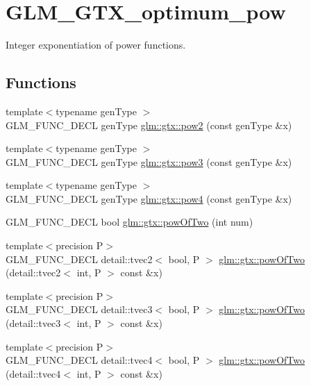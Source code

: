 \hypertarget{group__gtx__optimum__pow}{}\section{G\+L\+M\+\_\+\+G\+T\+X\+\_\+optimum\+\_\+pow}
\label{group__gtx__optimum__pow}


Integer exponentiation of power functions.  


\subsection*{Functions}
\begin{DoxyCompactItemize}
\item 
{\footnotesize template$<$typename gen\+Type $>$ }\\G\+L\+M\+\_\+\+F\+U\+N\+C\+\_\+\+D\+E\+CL gen\+Type \hyperlink{group__gtx__optimum__pow_gad18baedb0f3eaea4b4544771e19574f5}{glm\+::gtx\+::pow2} (const gen\+Type \&x)
\item 
{\footnotesize template$<$typename gen\+Type $>$ }\\G\+L\+M\+\_\+\+F\+U\+N\+C\+\_\+\+D\+E\+CL gen\+Type \hyperlink{group__gtx__optimum__pow_ga47dbbd973d7ad8be1b135d57281e16cf}{glm\+::gtx\+::pow3} (const gen\+Type \&x)
\item 
{\footnotesize template$<$typename gen\+Type $>$ }\\G\+L\+M\+\_\+\+F\+U\+N\+C\+\_\+\+D\+E\+CL gen\+Type \hyperlink{group__gtx__optimum__pow_gabae007bac8e442a2601db03de5827107}{glm\+::gtx\+::pow4} (const gen\+Type \&x)
\item 
G\+L\+M\+\_\+\+F\+U\+N\+C\+\_\+\+D\+E\+CL bool \hyperlink{group__gtx__optimum__pow_ga399b24df28267c1f061c462dd359affd}{glm\+::gtx\+::pow\+Of\+Two} (int num)
\item 
{\footnotesize template$<$precision P$>$ }\\G\+L\+M\+\_\+\+F\+U\+N\+C\+\_\+\+D\+E\+CL detail\+::tvec2$<$ bool, P $>$ \hyperlink{group__gtx__optimum__pow_ga2dff80972edb8f4be69e40bb27ed0a9b}{glm\+::gtx\+::pow\+Of\+Two} (detail\+::tvec2$<$ int, P $>$ const \&x)
\item 
{\footnotesize template$<$precision P$>$ }\\G\+L\+M\+\_\+\+F\+U\+N\+C\+\_\+\+D\+E\+CL detail\+::tvec3$<$ bool, P $>$ \hyperlink{group__gtx__optimum__pow_ga103cbf6e3d63ab4c2bb5449e19b8639d}{glm\+::gtx\+::pow\+Of\+Two} (detail\+::tvec3$<$ int, P $>$ const \&x)
\item 
{\footnotesize template$<$precision P$>$ }\\G\+L\+M\+\_\+\+F\+U\+N\+C\+\_\+\+D\+E\+CL detail\+::tvec4$<$ bool, P $>$ \hyperlink{group__gtx__optimum__pow_ga3471bc7e9e580f6b76647cb5156135cc}{glm\+::gtx\+::pow\+Of\+Two} (detail\+::tvec4$<$ int, P $>$ const \&x)
\end{DoxyCompactItemize}


